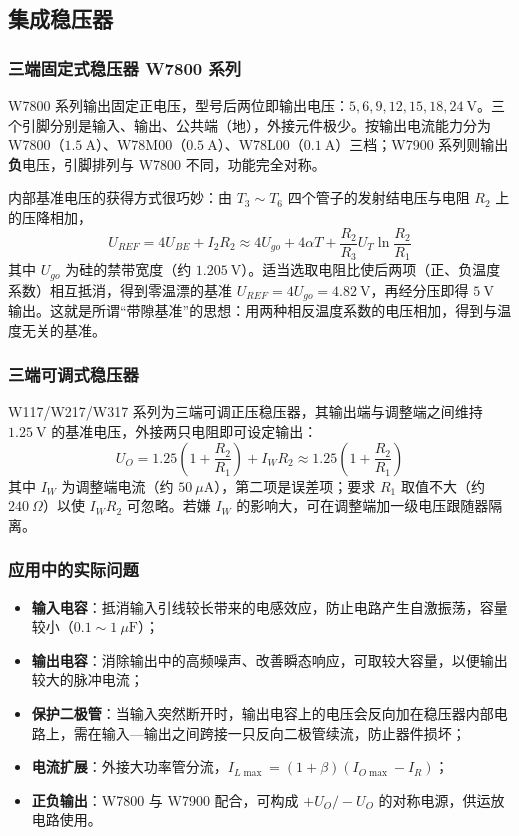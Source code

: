\subsection{集成稳压器}
\subsubsection{三端固定式稳压器 W7800 系列}
W7800 系列输出固定正电压，型号后两位即输出电压：$5,6,9,12,15,18,24\ \mathrm{V}$。三个引脚分别是输入、输出、公共端（地），外接元件极少。按输出电流能力分为 W7800（$1.5\ \mathrm{A}$）、W78M00（$0.5\ \mathrm{A}$）、W78L00（$0.1\ \mathrm{A}$）三档；W7900 系列则输出\textbf{负}电压，引脚排列与 W7800 不同，功能完全对称。

内部基准电压的获得方式很巧妙：由 $T_3\sim T_6$ 四个管子的发射结电压与电阻 $R_2$ 上的压降相加，
\begin{equation}
U_{REF}=4U_{BE}+I_2R_2\approx4U_{go}+4\alpha T+\frac{R_2}{R_3}U_T\ln\frac{R_2}{R_1}
\end{equation}
其中 $U_{go}$ 为硅的禁带宽度（约 $1.205\ \mathrm{V}$）。适当选取电阻比使后两项（正、负温度系数）相互抵消，得到零温漂的基准 $U_{REF}=4U_{go}=4.82\ \mathrm{V}$，再经分压即得 $5\ \mathrm{V}$ 输出。这就是所谓“带隙基准”的思想：用两种相反温度系数的电压相加，得到与温度无关的基准。

\subsubsection{三端可调式稳压器}
W117/W217/W317 系列为三端可调正压稳压器，其输出端与调整端之间维持 $1.25\ \mathrm{V}$ 的基准电压，外接两只电阻即可设定输出：
\begin{equation}
U_O=1.25\left(1+\frac{R_2}{R_1}\right)+I_WR_2\approx1.25\left(1+\frac{R_2}{R_1}\right)
\end{equation}
其中 $I_W$ 为调整端电流（约 $50\ \mu\mathrm{A}$），第二项是误差项；要求 $R_1$ 取值不大（约 $240\ \Omega$）以使 $I_WR_2$ 可忽略。若嫌 $I_W$ 的影响大，可在调整端加一级电压跟随器隔离。

\subsubsection{应用中的实际问题}
\begin{itemize}
    \item \textbf{输入电容}：抵消输入引线较长带来的电感效应，防止电路产生自激振荡，容量较小（$0.1\sim1\ \mu\mathrm{F}$）；
    \item \textbf{输出电容}：消除输出中的高频噪声、改善瞬态响应，可取较大容量，以便输出较大的脉冲电流；
    \item \textbf{保护二极管}：当输入突然断开时，输出电容上的电压会反向加在稳压器内部电路上，需在输入—输出之间跨接一只反向二极管续流，防止器件损坏；
    \item \textbf{电流扩展}：外接大功率管分流，$I_{L\max}=(1+\beta)(I_{O\max}-I_R)$；
    \item \textbf{正负输出}：W7800 与 W7900 配合，可构成 $+U_O/-U_O$ 的对称电源，供运放电路使用。
\end{itemize}

